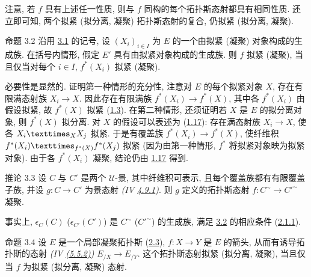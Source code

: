 \setcounter{subsection}{1}
\setcounter{subsubsection}{0}
\subsubsection{}
注意, 若 $f$ 具有上述任一性质,
则与 $f$ 同构的每个拓扑斯态射都具有相同性质.
还立即可知, 两个拟紧 (\resp 拟分离, \resp 凝聚) 拓扑斯态射的复合,
仍拟紧 (\resp 拟分离, \resp 凝聚).

\begin{enonce*}{命题 3.2}
沿用\pageoriginale{} \hyperref[VI.def3.1]{3.1} 的记号,
设 $(X_i)_{i\in I}$ 为 $E$ 的一个由拟紧
(\resp 凝聚) 对象构成的生成族.
在括号内情形, 假定 $E'$ 具有由拟紧对象构成的生成族.
则 $f$ 拟紧 (\resp 凝聚),
当且仅当对每个 $i\in I$, $f^{\ast}(X_i)$ 拟紧 (\resp 凝聚).
\end{enonce*}

必要性是显然的.
证明第一种情形的充分性,
注意对 $E$ 的每个拟紧对象 $X$,
存在有限满态射族 $X_i\to X$.
因此存在有限满族 $f^{\ast}(X_i)\to f^{\ast}(X)$,
其中各 $f^{\ast}(X_i)$ 由假设拟紧,
故 $f^{\ast}(X)$ 拟紧 (\hyperref[VI.prop1.3]{1.3}).
在第二种情形, 还须证明若 $X$ 是 $E$ 的拟分离对象,
则 $f^{\ast}(X)$ 拟分离.
对 $X$ 的假设可以表述为 (\hyperref[VI.cor1.17]{1.17}):
存在满态射族 $X_i\to X$,
使各 $\fprod{X_i}{X_j}{X}$ 拟紧.
于是有覆盖族 $f^{\ast}(X_i)\to f^{\ast}(X)$,
使纤维积
$\fprod{f^{\ast}(X_i)}{f^{\ast}(X_j)}{f^{\ast}(X)}$ 拟紧
(因为由第一种情形, $f^{\ast}$ 将拟紧对象映为拟紧对象).
由于各 $f^{\ast}(X_i)$ 凝聚,
结论仍由 \hyperref[VI.cor1.17]{1.17} 得到.

\begin{enonce*}{推论 3.3}
设 $C$ 与 $C'$ 是两个 $𝒰$-景,
其中纤维积可表示, 且每个覆盖族都有有限覆盖子族,
并设 $g:C\to C'$ 为景态射
\emph{(IV \hyperref[IV.subsubsec4.9.1]{4.9.1})}.
则 $g$ 定义的拓扑斯态射
$f:C^{\sim}\to{C'}^{\sim}$ 凝聚.
\end{enonce*}

事实上\pageoriginale{},
$\epsilon_C(C)$ (\resp $\epsilon_{C'}(C')$)
是 $C^{\sim}$ (\resp ${C'}^{\sim}$) 的生成族,
满足 \hyperref[VI.prop3.2]{3.2} 的相应条件
(\hyperref[VI.cor2.1.1]{2.1.1}).

\begin{enonce*}{命题 3.4}
设 $E$ 是一个局部凝聚拓扑斯
(\hyperref[VI.def2.3]{2.3}),
$f:X\to Y$ 是 $E$ 的箭头,
从而有诱导拓扑斯的态射
\emph{(IV \hyperref[IV.eq5.5.2]{(5.5.2)})} $E_{/X}\to E_{/Y}$.
这个拓扑斯态射拟紧 (\resp 拟分离, \resp 凝聚),
当且仅当 $f$ 为拟紧 (\resp 拟分离, \resp 凝聚) 态射.
\end{enonce*}

